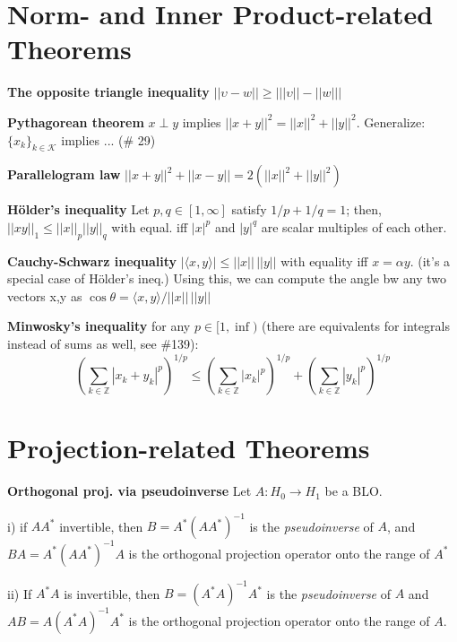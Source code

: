 \documentclass{article}
\newcommand{\la}{\langle}
\newcommand{\ra}{\rangle}
\begin{document}
\section{Norm- and Inner Product-related Theorems}
\label{nomr_thms}
\textbf{The opposite triangle inequality}
$||\upsilon-w||\ge \big| ||\upsilon||-||w|| \big|$ 

\textbf{Pythagorean theorem}
$x\perp y$ implies $||x+y||^2=||x||^2+||y||^2$. Generalize: $\{x_k\}_{k\in \mathcal{K}}$ implies ... (\# 29)

\textbf{Parallelogram law} $||x+y||^2+||x-y||=2(||x||^2+||y||^2)$

\textbf{H\"older's inequality} Let $p,q\in [1,\infty]$ satisfy $1/p+1/q=1$; then, $||xy||_1 \le ||x||_p ||y||_q$ with equal. iff $|x|^p$ and $|y|^q$ are scalar multiples of each other.

\textbf{Cauchy-Schwarz inequality} $|\la x,y\ra|\le ||x||\, ||y||$ with equality iff $x=\alpha y$. (it's a special case of H\"older's ineq.) Using this, we can compute the angle bw any two vectors x,y as $\cos \theta = \la x,y \ra/||x||\,||y||$

\textbf{Minwosky's inequality} for any $p\in [1,\inf)$ (there are equivalents for integrals instead of sums as well, see \#139):
\begin{equation}
\left(\sum\limits_{k\in\mathbb{Z}}|x_k+y_k|^p \right)^{1/p} \le \left(\sum\limits_{k\in\mathbb{Z}}|x_k|^p \right)^{1/p}+\left(\sum\limits_{k\in\mathbb{Z}}|y_k|^p \right)^{1/p}
\end{equation}

\section{Projection-related Theorems}
\label{pseudoinv}
\textbf{Orthogonal proj. via pseudoinverse} Let $A: H_0 \rightarrow H_1$ be a BLO.

i) if $AA^{*}$ invertible, then $B=A^{*}(AA^{*})^{-1}$ is the \textit{pseudoinverse} of $A$, and $BA=A^{*}(AA^{*})^{-1}A$ is the orthogonal projection operator onto the range of $A^{*}$

ii) If $A^{*}A$ is invertible, then $B=(A^{*}A)^{-1}A^{*}$ is the \textit{pseudoinverse} of $A$ and $AB=A(A^{*}A)^{-1}A^{*}$  is the orthogonal projection operator onto the range of $A$.
\end{document}
